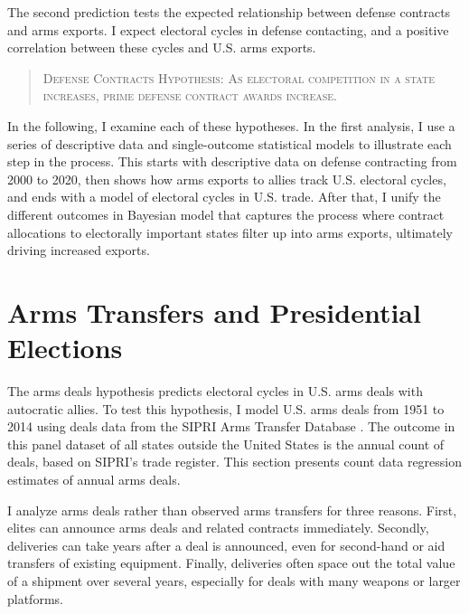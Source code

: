 \documentclass[12pt]{article}
\begin{document}
The second prediction tests the expected relationship between defense contracts and arms exports. 
I expect electoral cycles in defense contacting, and a positive correlation between these cycles and U.S. arms exports.


\begin{quote}
\textsc{Defense Contracts Hypothesis: As electoral competition in a state increases, prime defense contract awards increase.}
\end{quote}



In the following, I examine each of these hypotheses. 
In the first analysis, I use a series of descriptive data and single-outcome statistical models to illustrate each step in the process.
This starts with descriptive data on defense contracting from 2000 to 2020, then shows how arms exports to allies track U.S. electoral cycles, and ends with a model of electoral cycles in U.S. trade. 
After that, I unify the different outcomes in Bayesian model that captures the process where contract allocations to electorally important states filter up into arms exports, ultimately driving increased exports.



\section{Arms Transfers and Presidential Elections}


The arms deals hypothesis predicts electoral cycles in U.S. arms deals with autocratic allies.
To test this hypothesis, I model U.S. arms deals from 1951 to 2014 using deals data from the SIPRI Arms Transfer Database \citep{SIPRI2021}.
The outcome in this panel dataset of all states outside the United States is the annual count of deals, based on SIPRI's trade register. 
This section presents count data regression estimates of annual arms deals. 


I analyze arms deals rather than observed arms transfers for three reasons.
First, elites can announce arms deals and related contracts immediately. 
Secondly, deliveries can take years after a deal is announced, even for second-hand or aid transfers of existing equipment. 
Finally, deliveries often space out the total value of a shipment over several years, especially for deals with many weapons or larger platforms. 
\end{document}
